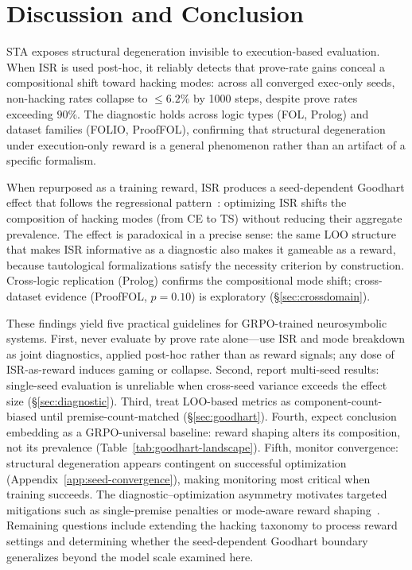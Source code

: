 \section{Discussion and Conclusion}
\label{sec:discussion}

STA exposes structural degeneration invisible to execution-based evaluation.
When ISR is used post-hoc, it reliably detects that prove-rate gains conceal a compositional shift toward hacking modes: across all converged exec-only seeds, non-hacking rates collapse to ${\leq}6.2\%$ by 1000 steps, despite prove rates exceeding $90\%$.
The diagnostic holds across logic types (FOL, Prolog) and dataset families (FOLIO, ProofFOL), confirming that structural degeneration under execution-only reward is a general phenomenon rather than an artifact of a specific formalism.

When repurposed as a training reward, ISR produces a seed-dependent Goodhart effect that follows the regressional pattern~\citep{manheim-goodhart-taxonomy}: optimizing ISR shifts the composition of hacking modes (from CE to TS) without reducing their aggregate prevalence.
The effect is paradoxical in a precise sense: the same LOO structure that makes ISR informative as a diagnostic also makes it gameable as a reward, because tautological formalizations satisfy the necessity criterion by construction.
Cross-logic replication (Prolog) confirms the compositional mode shift; cross-dataset evidence (ProofFOL, $p{=}0.10$) is exploratory (\S\ref{sec:crossdomain}).

These findings yield five practical guidelines for GRPO-trained neurosymbolic systems.
First, never evaluate by prove rate alone---use ISR and mode breakdown as joint diagnostics, applied post-hoc rather than as reward signals; any dose of ISR-as-reward induces gaming or collapse.
Second, report multi-seed results: single-seed evaluation is unreliable when cross-seed variance exceeds the effect size (\S\ref{sec:diagnostic}).
Third, treat LOO-based metrics as component-count-biased until premise-count-matched (\S\ref{sec:goodhart}).
Fourth, expect conclusion embedding as a GRPO-universal baseline: reward shaping alters its composition, not its prevalence (Table~\ref{tab:goodhart-landscape}).
Fifth, monitor convergence: structural degeneration appears contingent on successful optimization (Appendix~\ref{app:seed-convergence}), making monitoring most critical when training succeeds.
The diagnostic--optimization asymmetry motivates targeted mitigations such as single-premise penalties or mode-aware reward shaping~\citep{tarek2025reward, pronesti2026beyond}.
Remaining questions include extending the hacking taxonomy to process reward settings and determining whether the seed-dependent Goodhart boundary generalizes beyond the model scale examined here.
